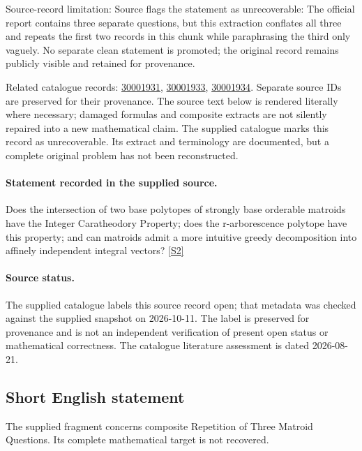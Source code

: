\documentclass[11pt]{article}
\begin{document}
Source-record limitation: Source flags the statement as unrecoverable: The official report contains three separate questions, but this extraction conflates all three and repeats the first two records in this chunk while paraphrasing the third only vaguely. No separate clean statement is promoted; the original record remains publicly visible and retained for provenance.

Related catalogue records: \href{https://mehmetmars7.github.io/Erdosproblems-llm-hunter/problem.html?type=open_problems&id=30001931}{30001931}, \href{https://mehmetmars7.github.io/Erdosproblems-llm-hunter/problem.html?type=open_problems&id=30001933}{30001933}, \href{https://mehmetmars7.github.io/Erdosproblems-llm-hunter/problem.html?type=open_problems&id=30001934}{30001934}. Separate source IDs are preserved for their provenance.
The source text below is rendered literally where necessary; damaged formulas and composite extracts are not silently repaired into a new mathematical claim.
The supplied catalogue marks this record as unrecoverable. Its extract and terminology are documented, but a complete original problem has not been reconstructed.
\paragraph{Statement recorded in the supplied source.}
Does the intersection of two base polytopes of strongly base orderable matroids have the Integer Caratheodory Property; does the r-arborescence polytope have this property; and can matroids admit a more intuitive greedy decomposition into affinely independent integral vectors? \href{https://doi.org/10.4171/owr/2011/53}{[S2]}
\paragraph{Source status.}
The supplied catalogue labels this source record open; that metadata was checked against the supplied snapshot on 2026-10-11. The label is preserved for provenance and is not an independent verification of present open status or mathematical correctness. The catalogue literature assessment is dated 2026-08-21.
\subsection{Short English statement}
The supplied fragment concerns composite Repetition of Three Matroid Questions. Its complete mathematical target is not recovered.
\end{document}
